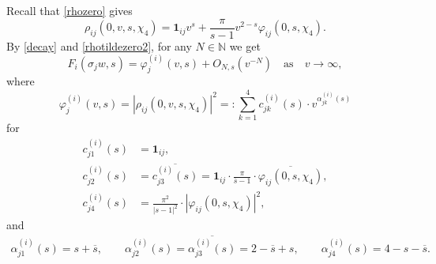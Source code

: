 \documentclass[12pt,reqno]{amsart}
\numberwithin{equation}{section}
\begin{document}
Recall that \eqref{rhozero} gives
\begin{equation} \label{rhotildezero2}
    \rho_{i j}(0,v,s,\chi_4)=\mathbf{1}_{i j} v^{s}  + \frac{\pi}{s-1} v^{2-s} \varphi_{i j}(0,s,\chi_4).
\end{equation}
By \eqref{decay} and \eqref{rhotildezero2}, for any $N \in \mathbb{N}$ we get
\begin{equation} \label{constantFasymp}
    F_i(\sigma_{j}w, s) = \varphi_{j}^{(i)}(v,s) + O_{N,s}(v^{-N}) \quad \text{as} \quad v \to \infty,
\end{equation}
where
\begin{equation} \label{varphiFdefine}
    \varphi_{j}^{(i)} (v,s) = |{\rho_{i j}(0,v,s,\chi_4)}|^2=: \sum_{k=1}^{4} c^{(i)}_{jk}(s) \cdot v^{\alpha^{(i)}_{jk}(s)}
\end{equation}
for
\begin{equation}
    \begin{aligned} \label{c23}
        c^{(i)}_{j1}(s)&=\mathbf{1}_{i j},  \\
        c^{(i)}_{j2}(s)&= \overline{c^{(i)}_{j3}(s)}= \mathbf{1}_{i j} \cdot \frac{\pi}{\overline{s}-1} \cdot 
        \overline{\varphi_{i j}(0,s,\chi_4)},  \\
        c^{(i)}_{j4}(s)&= \frac{\pi^2}{|s-1|^2} \cdot |\varphi_{i j}(0,s,\chi_4)|^2, 
    \end{aligned}
\end{equation}
and
\begin{align}\label{alphas}
    \alpha^{(i)}_{j1}(s)=s+\overline{s},\qquad
    \alpha^{(i)}_{j2}(s)=\overline{\alpha^{(i)}_{j3}(s)}=2-\overline{s}+s,  \qquad
    \alpha^{(i)}_{j4}(s)=4-s-\overline{s}.  
\end{align}
\end{document}
